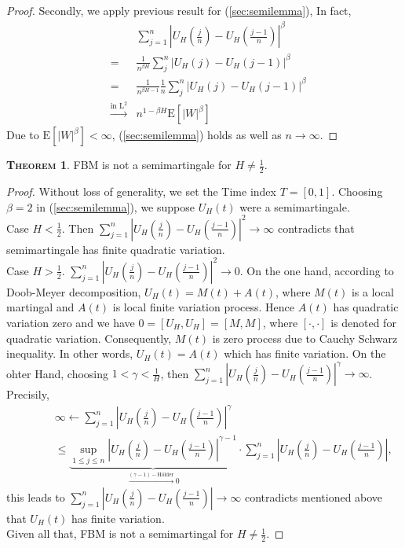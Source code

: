 \documentclass[a4paper, twoside, 11pt]{article}
\theoremstyle{definition}
\newtheorem{theorem}[definition]{\scshape Theorem}
\begin{document}
\begin{proof}
	Secondly, we apply previous result for (\ref{sec:semilemma}), In fact,
	\begin{eqnarray*}
		&&\sum_{j=1}^n |U_H(\frac{j}{n}) - U_H(\frac{j-1}{n})|^\beta\\
		&=& \frac{1}{n^{\beta H}} \sum_{j}^n|U_H(j) - U_H(j-1)|^\beta\\
		&=& \frac{1}{n^{\beta H-1}} \frac{1}{n}\sum_{j}^n|U_H(j) - U_H(j-1)|^\beta\\
		&\overset{\text{in }\mathrm{L}^2}{\longrightarrow}& n^{1-\beta H}\mathrm{E}[|W|^\beta]
	  \end{eqnarray*}
	  Due to $\mathrm{E}[|W|^\beta] < \infty$, (\ref{sec:semilemma}) holds as well as $n\rightarrow \infty$.
\end{proof}
\begin{theorem}
  FBM is not a semimartingale for $H\neq \frac{1}{2}$.
\end{theorem}
\begin{proof}
  Without loss of generality, we set the Time index $T=[0, 1]$. Choosing $\beta=2$ in (\ref{sec:semilemma}), we suppose $U_H(t)$ were a semimartingale.\\
  Case $H < \frac{1}{2}$. Then $\sum_{j=1}^n |U_H(\frac{j}{n}) - U_H(\frac{j-1}{n})|^2\rightarrow\infty$ contradicts that semimartingale has finite quadratic variation.\\
  Case $H > \frac{1}{2}$. $\sum_{j=1}^n |U_H(\frac{j}{n}) - U_H(\frac{j-1}{n})|^2\rightarrow 0$. On the one hand, according to Doob-Meyer decomposition, $U_H(t) = M(t) + A(t)$, where $M(t)$ is a local martingal and $A(t)$ is local finite variation process. Hence $A(t)$ has quadratic variation zero and we have $0=[U_H, U_H] = [M, M] $, where $[\cdot,\cdot]$ is denoted for quadratic variation. Consequently, $M(t)$ is zero process due to Cauchy Schwarz inequality. In other words, $U_H(t)=A(t)$ which has finite variation. On the ohter Hand, choosing $1<\gamma<\frac{1}{H}$, then $\sum_{j=1}^n |U_H(\frac{j}{n}) - U_H(\frac{j-1}{n})|^\gamma \rightarrow \infty$. Precisily, 
  \begin{eqnarray*}
	 &&\infty \leftarrow \sum_{j=1}^n |U_H(\frac{j}{n}) - U_H(\frac{j-1}{n})|^\gamma\\
	 &\hspace{2em}&\le \underbrace{\sup\limits_{1\le j\le n}|U_H(\frac{j}{n}) - U_H(\frac{j-1}{n})|^{\gamma-1}}_{\overset{(\gamma-1)-\text{H\"older}}{\rightarrow}0} \cdot \sum_{j=1}^n|U_H(\frac{j}{n}) - U_H(\frac{j-1}{n})|,
  \end{eqnarray*}
  this leads to $\sum_{j=1}^n|U_H(\frac{j}{n}) - U_H(\frac{j-1}{n})|\rightarrow \infty$ contradicts mentioned above that $U_H(t)$ has finite variation.\\
  Given all that, FBM is not a semimartingal for $H\neq \frac{1}{2}$.
\end{proof}
\end{document}
